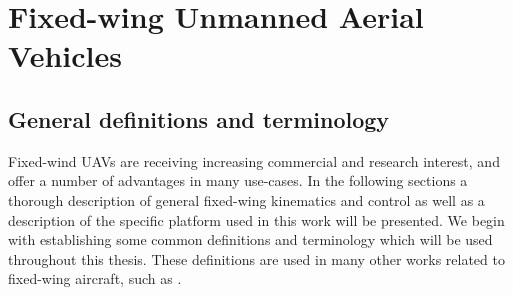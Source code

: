 
\chapter{Fixed-wing Unmanned Aerial Vehicles}\label{cha:fixed_wing_uav}
\section{General definitions and terminology}
Fixed-wind UAVs are receiving increasing commercial and research interest, and offer a number of advantages in many use-cases. In the following sections a thorough description of
general fixed-wing kinematics and control as well as a description of the specific platform used in this work will be presented. 
We begin with establishing some common definitions and terminology which will be used throughout this thesis. These definitions are 
 used in many other works related to fixed-wing aircraft, such as \cite{uav_dynamics_wind}. 

